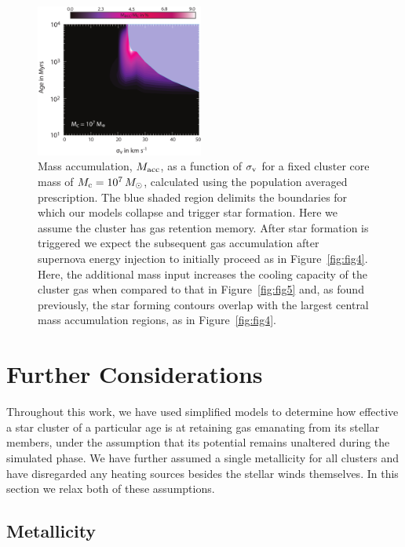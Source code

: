 \documentclass[fleqn,usenatbib]{mnras}
\begin{document}
\begin{figure}
\centering\includegraphics[width=0.49\textwidth]{memoryContour.pdf}
\caption{Mass accumulation, $M_{\rm acc}$, as a function of  $\sigma_{\rm v}$ for a fixed cluster core 
mass of $M_{\rm c} = 10^7 \, M_\odot$, calculated using  the population averaged 
prescription.  The blue shaded region delimits the boundaries for which our models collapse and trigger star formation.  Here we assume the cluster has gas retention memory. After star formation is triggered we expect the subsequent gas accumulation after supernova energy injection to initially proceed as in Figure~\ref{fig:fig4}.  Here, the additional mass input increases the cooling capacity of the cluster gas when compared to that in Figure~\ref{fig:fig5} and, as found previously,   the star forming contours overlap with the largest central mass accumulation regions, as in Figure~\ref{fig:fig4}. }
\label{fig:memcontour}
\end{figure} 




\section{Further Considerations} \label{section:discussion}

Throughout this work, we have used simplified  models to determine how effective  a  star cluster of a particular age  is at retaining  gas emanating from its  stellar members, under the assumption that its potential remains unaltered during  the simulated phase. We have further assumed a single metallicity for all clusters and have disregarded any heating sources besides the stellar winds themselves.  In this section we relax both of these assumptions. 



\subsection{Metallicity}
\end{document}
